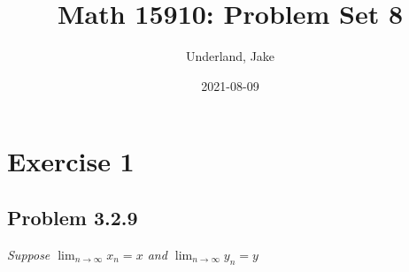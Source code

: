 \documentclass[
]{article}
\title{Math 15910: Problem Set 8}
\author{Underland, Jake}
\date{2021-08-09}
\begin{document}
\maketitle

{
\setcounter{tocdepth}{2}
\tableofcontents
}
\hypertarget{exercise-1}{%
\section{Exercise 1}\label{exercise-1}}

\hypertarget{problem-3.2.9}{%
\subsection{Problem 3.2.9}\label{problem-3.2.9}}

\textit{Suppose $\lim _{n \to \infty} x_n = x $ and $\lim _{n \to \infty} y_n = y $}
\end{document}
